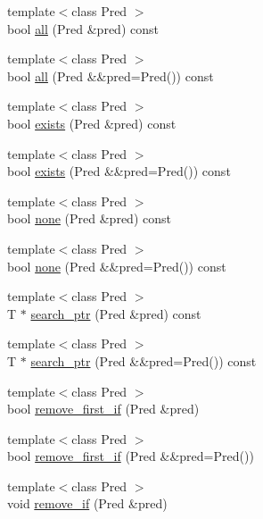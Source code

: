 \begin{DoxyCompactItemize}
{\footnotesize template$<$class Pred $>$ }\\bool \hyperlink{class_designar_1_1_container_algorithms_a81f6c5f0fa93c2ef34cd8636f503bdf3}{all} (Pred \&pred) const
\item 
{\footnotesize template$<$class Pred $>$ }\\bool \hyperlink{class_designar_1_1_container_algorithms_a1adbc18f2c7a7731ff91f98aae034c45}{all} (Pred \&\&pred=Pred()) const
\item 
{\footnotesize template$<$class Pred $>$ }\\bool \hyperlink{class_designar_1_1_container_algorithms_a84b04f83c37c70e2b25e943ca0579261}{exists} (Pred \&pred) const
\item 
{\footnotesize template$<$class Pred $>$ }\\bool \hyperlink{class_designar_1_1_container_algorithms_a12f255f04ad0c63d58957f2869caff93}{exists} (Pred \&\&pred=Pred()) const
\item 
{\footnotesize template$<$class Pred $>$ }\\bool \hyperlink{class_designar_1_1_container_algorithms_aa91fe441074d132067cb5a3ad7870dc5}{none} (Pred \&pred) const
\item 
{\footnotesize template$<$class Pred $>$ }\\bool \hyperlink{class_designar_1_1_container_algorithms_a10a88dd8adee474d79cc412db2f5739c}{none} (Pred \&\&pred=Pred()) const
\item 
{\footnotesize template$<$class Pred $>$ }\\T $\ast$ \hyperlink{class_designar_1_1_container_algorithms_aa68717192cead08642f941dd4d9f06a1}{search\+\_\+ptr} (Pred \&pred) const
\item 
{\footnotesize template$<$class Pred $>$ }\\T $\ast$ \hyperlink{class_designar_1_1_container_algorithms_a4d399ce473d6cddf3e133044403f492d}{search\+\_\+ptr} (Pred \&\&pred=Pred()) const
\item 
{\footnotesize template$<$class Pred $>$ }\\bool \hyperlink{class_designar_1_1_container_algorithms_a955cc52c438153802a20a97d3e4c148a}{remove\+\_\+first\+\_\+if} (Pred \&pred)
\item 
{\footnotesize template$<$class Pred $>$ }\\bool \hyperlink{class_designar_1_1_container_algorithms_a564239c787d638bfd90846c9587cd6a6}{remove\+\_\+first\+\_\+if} (Pred \&\&pred=Pred())
\item 
{\footnotesize template$<$class Pred $>$ }\\void \hyperlink{class_designar_1_1_container_algorithms_a9f62149769fa7797947d019692306e09}{remove\+\_\+if} (Pred \&pred)

\end{DoxyCompactItemize}
